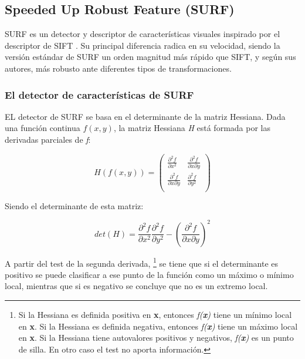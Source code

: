 \subsection{Speeded Up Robust Feature (SURF)}

SURF \cite{bay2008speeded} es un detector y descriptor de características visuales inspirado por el descriptor de SIFT \cite{Lowe04}. Su principal diferencia radica en su velocidad, siendo la versión estándar de SURF un orden magnitud más rápido que SIFT, y según sus autores, más robusto ante diferentes tipos de transformaciones.

\subsubsection{El detector de características de SURF}
EL detector de SURF se basa en el determinante de la matriz Hessiana. Dada una función continua $ f(x, y) $, la matriz Hessiana \textit{H} está formada por las derivadas parciales de \textit{f}:

\begin{equation}
H(f(x, y)) =
\left(
\begin{array}{cc}
\frac{\partial^2 f}{\partial x^2} & \frac{\partial^2 f}{{\partial x}{\partial y}} \\
\frac{\partial^2 f}{{\partial x}{\partial y}} & \frac{\partial^2 f}{\partial y^2} \\
\end{array}
\right)
\end{equation}

Siendo el determinante de esta matriz:

\begin{equation}
det(H) = \frac{\partial^2 f}{\partial x^2} \frac{\partial^2 f}{\partial y^2}
	 - \left( \frac{\partial^2 f}{{\partial x}{\partial y}} \right)^ 2
\end{equation}

A partir del test de la segunda derivada,
\footnote{Si la Hessiana es definida positiva en \textbf{x}, entonces \textit{f(\textbf{x})} tiene un mínimo local en \textbf{x}. Si la Hessiana es definida negativa, entonces \textit{f(\textbf{x})} tiene un máximo local en \textbf{x}. Si la Hessiana tiene autovalores positivos y negativos, \textit{f(\textbf{x})} es un punto de silla. En otro caso el test no aporta información.}
se tiene que si el determinante es positivo se puede clasificar a ese punto de la función como un máximo o mínimo local, mientras que si es negativo se concluye que no es un extremo local.

